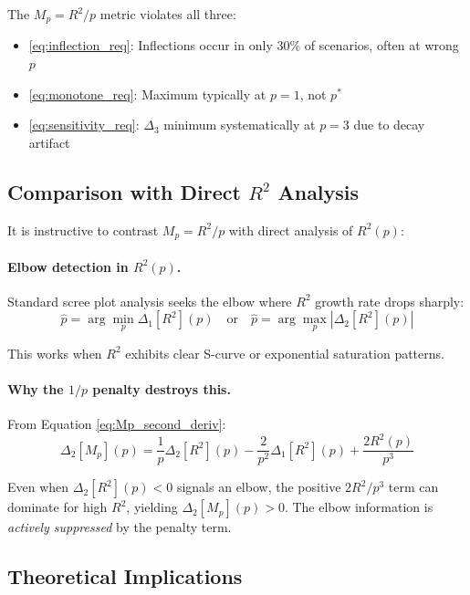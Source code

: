 \documentclass[11pt,a4paper]{article}
\begin{document}
The $M_p = R^2/p$ metric violates all three:
\begin{itemize}
\item \eqref{eq:inflection_req}: Inflections occur in only 30\% of scenarios, often at wrong $p$
\item \eqref{eq:monotone_req}: Maximum typically at $p = 1$, not $p^*$
\item \eqref{eq:sensitivity_req}: $\Delta_3$ minimum systematically at $p = 3$ due to decay artifact
\end{itemize}

\subsection{Comparison with Direct $R^2$ Analysis}

It is instructive to contrast $M_p = R^2/p$ with direct analysis of $R^2(p)$:

\paragraph{Elbow detection in $R^2(p)$.}
Standard scree plot analysis seeks the elbow where $R^2$ growth rate drops sharply:
\begin{equation}
\hat{p} = \arg\min_p \Delta_1[R^2](p) \quad \text{or} \quad \hat{p} = \arg\max_p |\Delta_2[R^2](p)|
\end{equation}

This works when $R^2$ exhibits clear S-curve or exponential saturation patterns.

\paragraph{Why the $1/p$ penalty destroys this.}
From Equation \eqref{eq:Mp_second_deriv}:
\begin{equation}
\Delta_2[M_p](p) = \frac{1}{p}\Delta_2[R^2](p) - \frac{2}{p^2}\Delta_1[R^2](p) + \frac{2R^2(p)}{p^3}
\end{equation}

Even when $\Delta_2[R^2](p) < 0$ signals an elbow, the positive $2R^2/p^3$ term can dominate for high $R^2$, yielding $\Delta_2[M_p](p) > 0$. The elbow information is \emph{actively suppressed} by the penalty term.

\subsection{Theoretical Implications}
\end{document}
